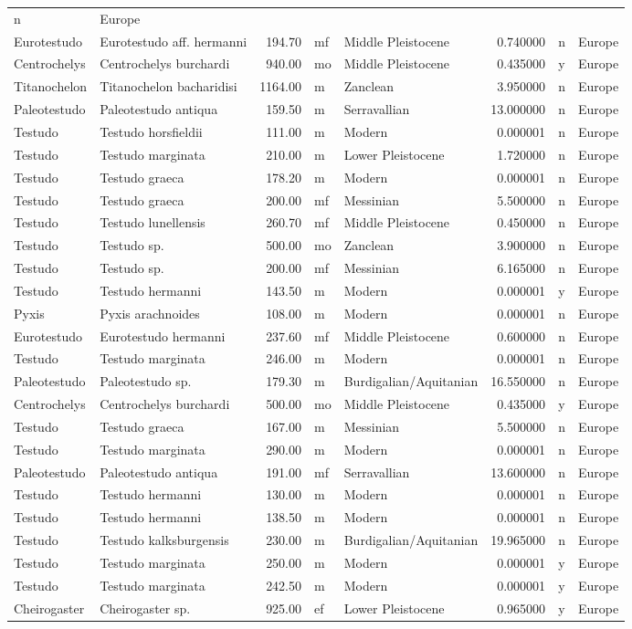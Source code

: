 \begin{landscape}
\begin{longtable}[]{@{}llrllrll@{}}
	n & Europe\tabularnewline
	Eurotestudo & Eurotestudo aff. hermanni & 194.70 & mf & Middle
	Pleistocene & 0.740000 & n & Europe\tabularnewline
	Centrochelys & Centrochelys burchardi & 940.00 & mo & Middle Pleistocene
	& 0.435000 & y & Europe\tabularnewline
	Titanochelon & Titanochelon bacharidisi & 1164.00 & m & Zanclean &
	3.950000 & n & Europe\tabularnewline
	Paleotestudo & Paleotestudo antiqua & 159.50 & m & Serravallian &
	13.000000 & n & Europe\tabularnewline
	Testudo & Testudo horsfieldii & 111.00 & m & Modern & 0.000001 & n &
	Europe\tabularnewline
	Testudo & Testudo marginata & 210.00 & m & Lower Pleistocene & 1.720000
	& n & Europe\tabularnewline
	Testudo & Testudo graeca & 178.20 & m & Modern & 0.000001 & n &
	Europe\tabularnewline
	Testudo & Testudo graeca & 200.00 & mf & Messinian & 5.500000 & n &
	Europe\tabularnewline
	Testudo & Testudo lunellensis & 260.70 & mf & Middle Pleistocene &
	0.450000 & n & Europe\tabularnewline
	Testudo & Testudo sp. & 500.00 & mo & Zanclean & 3.900000 & n &
	Europe\tabularnewline
	Testudo & Testudo sp. & 200.00 & mf & Messinian & 6.165000 & n &
	Europe\tabularnewline
	Testudo & Testudo hermanni & 143.50 & m & Modern & 0.000001 & y &
	Europe\tabularnewline
	Pyxis & Pyxis arachnoides & 108.00 & m & Modern & 0.000001 & n &
	Europe\tabularnewline
	Eurotestudo & Eurotestudo hermanni & 237.60 & mf & Middle Pleistocene &
	0.600000 & n & Europe\tabularnewline
	Testudo & Testudo marginata & 246.00 & m & Modern & 0.000001 & n &
	Europe\tabularnewline
	Paleotestudo & Paleotestudo sp. & 179.30 & m & Burdigalian/Aquitanian &
	16.550000 & n & Europe\tabularnewline
	Centrochelys & Centrochelys burchardi & 500.00 & mo & Middle Pleistocene
	& 0.435000 & y & Europe\tabularnewline
	Testudo & Testudo graeca & 167.00 & m & Messinian & 5.500000 & n &
	Europe\tabularnewline
	Testudo & Testudo marginata & 290.00 & m & Modern & 0.000001 & n &
	Europe\tabularnewline
	Paleotestudo & Paleotestudo antiqua & 191.00 & mf & Serravallian &
	13.600000 & n & Europe\tabularnewline
	Testudo & Testudo hermanni & 130.00 & m & Modern & 0.000001 & n &
	Europe\tabularnewline
	Testudo & Testudo hermanni & 138.50 & m & Modern & 0.000001 & n &
	Europe\tabularnewline
	Testudo & Testudo kalksburgensis & 230.00 & m & Burdigalian/Aquitanian &
	19.965000 & n & Europe\tabularnewline
	Testudo & Testudo marginata & 250.00 & m & Modern & 0.000001 & y &
	Europe\tabularnewline
	Testudo & Testudo marginata & 242.50 & m & Modern & 0.000001 & y &
	Europe\tabularnewline
	Cheirogaster & Cheirogaster sp. & 925.00 & ef & Lower Pleistocene &
	0.965000 & y & Europe\tabularnewline

\end{longtable}
\end{landscape}

